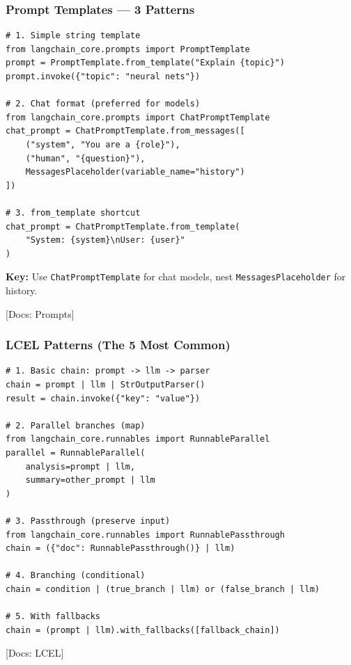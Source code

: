 \documentclass[aspectratio=169,11pt]{beamer}
\newcommand{\docref}[1]{{\scriptsize\color{docgray}[Docs: #1]}}
\begin{document}
\begin{frame}[fragile]
  \frametitle{Prompt Templates — 3 Patterns}

  \begin{lstlisting}
# 1. Simple string template
from langchain_core.prompts import PromptTemplate
prompt = PromptTemplate.from_template("Explain {topic}")
prompt.invoke({"topic": "neural nets"})

# 2. Chat format (preferred for models)
from langchain_core.prompts import ChatPromptTemplate
chat_prompt = ChatPromptTemplate.from_messages([
    ("system", "You are a {role}"),
    ("human", "{question}"),
    MessagesPlaceholder(variable_name="history")
])

# 3. from_template shortcut
chat_prompt = ChatPromptTemplate.from_template(
    "System: {system}\nUser: {user}"
)
  \end{lstlisting}

  \textbf{Key:} Use \texttt{ChatPromptTemplate} for chat models, nest \texttt{MessagesPlaceholder} for history.

  \docref{Prompts}
\end{frame}

\begin{frame}[fragile]
  \frametitle{LCEL Patterns (The 5 Most Common)}

  \begin{lstlisting}
# 1. Basic chain: prompt -> llm -> parser
chain = prompt | llm | StrOutputParser()
result = chain.invoke({"key": "value"})

# 2. Parallel branches (map)
from langchain_core.runnables import RunnableParallel
parallel = RunnableParallel(
    analysis=prompt | llm,
    summary=other_prompt | llm
)

# 3. Passthrough (preserve input)
from langchain_core.runnables import RunnablePassthrough
chain = ({"doc": RunnablePassthrough()} | llm)

# 4. Branching (conditional)
chain = condition | (true_branch | llm) or (false_branch | llm)

# 5. With fallbacks
chain = (prompt | llm).with_fallbacks([fallback_chain])
  \end{lstlisting}

  \docref{LCEL}
\end{frame}
\end{document}
